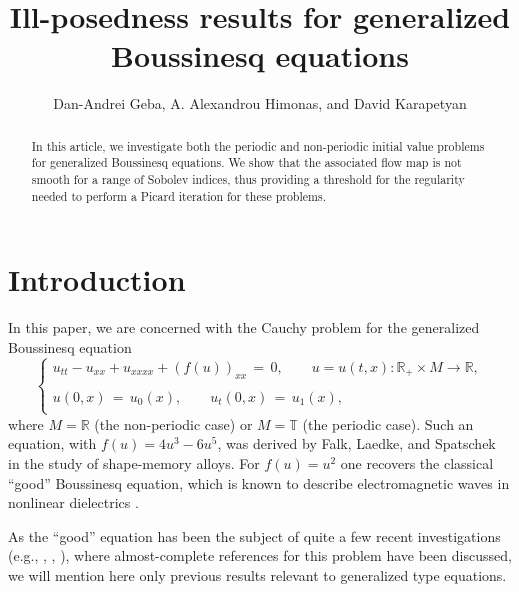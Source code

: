 \documentclass{amsart}
\begin{document}
\title{Ill-posedness results for generalized Boussinesq equations}

\author{Dan-Andrei Geba, A. Alexandrou Himonas, and David Karapetyan}

\address{Department of Mathematics, University of Rochester, Rochester, NY 14627}
\address{Department of Mathematics, University of Notre Dame, Notre Dame, IN 46556}
\address{Department of Mathematics, University of Rochester, Rochester, NY 14627}
\date{}

\begin{abstract}
In this article, we investigate both the periodic and non-periodic initial value problems for generalized Boussinesq equations. We show that the associated flow map is not smooth for a range of Sobolev indices, thus providing a threshold for the regularity needed to perform a Picard iteration for these problems. 
\end{abstract}


\maketitle

\section{Introduction}

In this paper, we are concerned with the Cauchy problem for the generalized Boussinesq equation
\begin{equation}
\left\{
\begin{array}{l}
u_{tt}-u_{xx}+u_{xxxx}+(f(u))_{xx}\,=\,0, \qquad u=u(t,x): \mathbb{R}_+\times M \to \mathbb{R},\\
\\
u(0,x)\,=\,u_0(x),\qquad u_t(0,x)\,=\,u_1(x),\\
\end{array}\right.
\label{main}
\end{equation}
where $M=\mathbb{R}$ (the non-periodic case) or $M=\mathbb{T}$ (the periodic case). Such an  equation, with $f(u)=4u^3-6u^5$, was derived by Falk, Laedke, and Spatschek \cite{FLS} in the study of shape-memory alloys. For $f(u) =  u^{2}$ one recovers the classical ``good'' Boussinesq equation, which is known to describe electromagnetic waves in nonlinear dielectrics \cite{T93}. 

As the ``good'' equation has been the subject of quite a few recent investigations (e.g., \cite{KT10}, \cite{OS12}, \cite{K12}), where almost-complete references for this problem have been discussed, we will mention here only previous results relevant to generalized type equations. 
\end{document}
